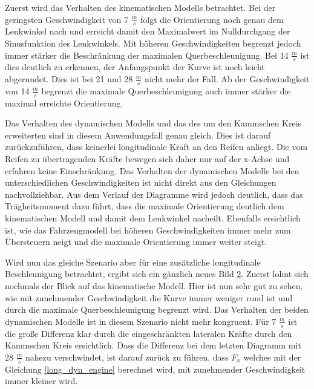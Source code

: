 \documentclass{like}
\begin{document}
\begin{figure}
	\centering
	 
	\caption{}
	\label{fig:modelDiffOrient}
\end{figure}

Zuerst wird das Verhalten des kinematischen Modells betrachtet. Bei der geringsten Geschwindigkeit von 7 $\frac{m}{s}$ folgt die Orientierung noch genau dem Lenkwinkel nach und erreicht damit den Maximalwert im Nulldurchgang der Sinusfunktion des Lenkwinkels. Mit höheren Geschwindigkeiten begrenzt jedoch immer stärker die Beschränkung der maximalen Querbeschleunigung. Bei 14 $\frac{m}{s}$ ist dies deutlich zu erkennen, der Anfangspunkt der Kurve ist noch leicht abgerundet. Dies ist bei 21 und 28 $\frac{m}{s}$ nicht mehr der Fall. Ab der Geschwindigkeit von 14 $\frac{m}{s}$ begrenzt die maximale Querbeschleunigung auch immer stärker die maximal erreichte Orientierung. 

Das Verhalten des dynamischen Modells und das des um den Kammschen Kreis erweiterten sind in diesem Anwendungsfall genau gleich. Dies ist darauf zurückzuführen, dass keinerlei longitudinale Kraft an den Reifen anliegt. Die vom Reifen zu übertragenden Kräfte bewegen sich daher nur auf der x-Achse und erfahren keine Einschränkung. 
Das Verhalten der dynamischen Modelle bei den unterschiedlichen Geschwindigkeiten ist nicht direkt aus den Gleichungen nachvollziehbar. Aus dem Verlauf der Diagramme wird jedoch deutlich, dass das Trägheitsmoment dazu führt, dass die maximale Orientierung deutlich dem kinematischen Modell und damit dem Lenkwinkel nacheilt. Ebenfalls ersichtlich ist, wie das Fahrzeugmodell bei höheren Geschwindigkeiten immer mehr zum Übersteuern neigt und die maximale Orientierung immer weiter steigt.  

\begin{figure}
	\centering
	 
	\caption{}
	\label{fig:modelDiffOrientMaxAcc}
\end{figure}


Wird nun das gleiche Szenario aber für eine zusätzliche longitudinale Beschleunigung betrachtet, ergibt sich ein gänzlich neues Bild \ref{fig:modelDiffOrientMaxAcc}.
Zuerst lohnt sich nochmals der Blick auf das kinematische Modell. Hier ist nun sehr gut zu sehen, wie mit zunehmender Geschwindigkeit die Kurve immer weniger rund ist und durch die maximale Querbeschleunigung begrenzt wird. Das Verhalten der beiden dynamischen Modelle ist in diesem Szenario nicht mehr kongruent. Für 7 $\frac{m}{s}$ ist die große Differenz klar durch die eingeschränkten lateralen Kräfte durch den Kammschen Kreis ersichtlich. Dass die Differenz bei dem letzten Diagramm mit 28 $\frac{m}{s}$ nahezu verschwindet, ist darauf zurück zu führen, dass $F_x$ welches mit der Gleichung \ref{long_dyn_engine} berechnet wird, mit zunehmender Geschwindigkeit immer kleiner wird. 
\end{document}
